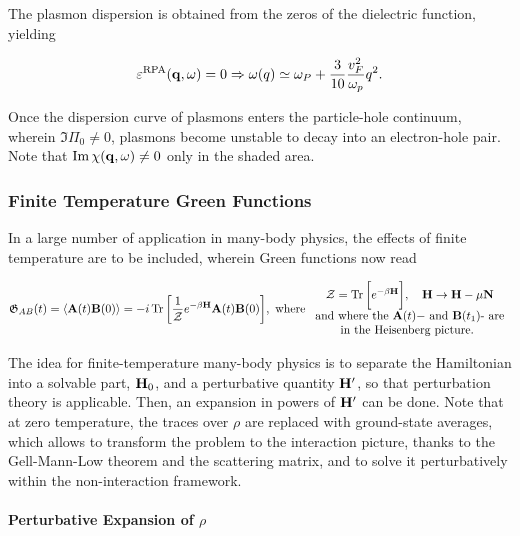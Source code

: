 The plasmon dispersion is obtained from the zeros of the dielectric function, yielding 

\begin{equation*}
    \varepsilon^{\textnormal{RPA}}({\bf q}, \omega) = 0 \Rightarrow \omega(q) \simeq \omega_P + \frac{3}{10} \frac{v_F^2}{\omega_p} q^2. 
\end{equation*}

Once the dispersion curve of plasmons enters the particle-hole continuum, wherein $\Im \Pi_0 \neq 0$, plasmons become unstable to decay into an electron-hole pair. Note that $\Im \chi({\bf q}, \omega) \neq 0$ only in the shaded area. \\

\subsubsection{Finite Temperature Green Functions}

In a large number of application in many-body physics, the effects of finite temperature are to be included, wherein Green functions now read

\begin{equation}
    \mathfrak{G}_{AB}(t) = \langle {\bf A}(t) {\bf B}(0) \rangle = -i \Tr \bigg[\frac{1}{\mathcal{Z}} e^{-\beta {\bf H}} {\bf A}(t) {\bf B}(0)\bigg], \textnormal{ where } \begin{array}{cc}
         \mathcal{Z} = \Tr \bigg[e^{-\beta {\bf H}}\bigg], \quad
         {\bf H} \rightarrow {\bf H} - \mu {\bf N} \\
         \textnormal{and where the ${\bf A}(t)-$ and ${\bf B}(t_1)$- are} \\
         \textnormal{in the Heisenberg picture. }
    \end{array}
\end{equation}

The idea for finite-temperature many-body physics is to separate the Hamiltonian into a solvable part, ${\bf H}_0$, and a perturbative quantity ${\bf H'}$, so that perturbation theory is applicable. Then, an expansion in powers of ${\bf H'}$ can be done. Note that at zero temperature, the traces over $\rho$ are replaced with ground-state averages, which allows to transform the problem to the interaction picture, thanks to the Gell-Mann-Low theorem and the scattering matrix, and to solve it perturbatively within the non-interaction framework. \\

\paragraph{Perturbative Expansion of $\rho$}

